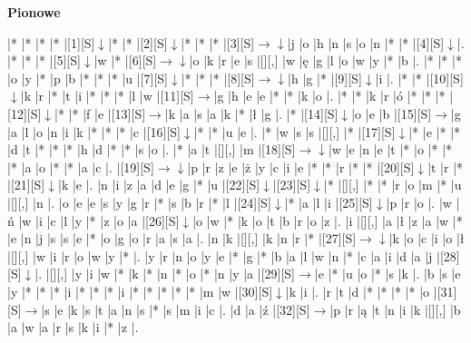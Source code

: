 \documentclass[11pt]{article}
\newcommand\drarr{$\rightarrow \!\!\!\!\! \downarrow$}
\newcommand\rarr{$\rightarrow$}
\newcommand\darr{$\downarrow$}
\begin{document}
\begin{PuzzleClues}{\textbf{Pionowe}\\}
\end{PuzzleClues}\newpage%

\noindent\begin{Puzzle}{21}{26}|*	|*	|*	|*	|[1][S]\darr	|*	|*	|[2][S]\darr	|*	|*	|*	|[3][S]\drarr	|j	|o	|h	|n	|s	|o	|n	|*	|*	|[4][S]\darr	|.
|*	|*	|*	|[5][S]\darr	|w	|*	|[6][S]\drarr	|o	|k	|r	|e	|s	|[][,]{ }	|w	|ę	|g	|l	|o	|w	|y	|*	|b	|.
|*	|*	|*	|o	|y	|*	|p	|b	|*	|*	|*	|u	|[7][S]\darr	|*	|*	|*	|[8][S]\drarr	|h	|g	|*	|[9][S]\darr	|i	|.
|*	|*	|[10][S]\darr	|k	|r	|*	|t	|i	|*	|*	|*	|l	|w	|[11][S]\rarr	|g	|h	|e	|e	|*	|*	|k	|o	|.
|*	|*	|k	|r	|ó	|*	|*	|*	|[12][S]\darr	|*	|*	|f	|e	|[13][S]\rarr	|k	|a	|s	|a	|k	|*	|ł	|g	|.
|*	|[14][S]\darr	|o	|e	|b	|[15][S]\rarr	|g	|a	|l	|o	|n	|i	|k	|*	|*	|*	|c	|[16][S]\darr	|*	|*	|u	|e	|.
|*	|w	|s	|s	|[][,]{ }	|*	|[17][S]\darr	|*	|e	|*	|*	|d	|t	|*	|*	|*	|h	|d	|*	|*	|s	|o	|.
|*	|a	|t	|[][,]{ }	|m	|[18][S]\drarr	|w	|e	|n	|e	|t	|*	|o	|*	|*	|*	|a	|o	|*	|*	|a	|c	|.
|[19][S]\drarr	|p	|r	|z	|e	|ż	|y	|c	|i	|e	|*	|*	|r	|*	|*	|[20][S]\darr	|t	|r	|*	|[21][S]\darr	|k	|e	|.
|n	|i	|z	|a	|d	|e	|g	|*	|u	|[22][S]\darr	|[23][S]\darr	|*	|[][,]{ }	|*	|*	|r	|o	|m	|*	|u	|[][,]{ }	|n	|.
|o	|e	|e	|s	|y	|g	|r	|*	|s	|b	|r	|*	|l	|[24][S]\darr	|*	|a	|l	|i	|[25][S]\darr	|p	|r	|o	|.
|w	|ń	|w	|i	|c	|l	|y	|*	|z	|o	|a	|[26][S]\darr	|o	|w	|*	|k	|o	|t	|b	|r	|o	|z	|.
|i	|[][,]{ }	|a	|ł	|z	|a	|w	|*	|e	|n	|j	|s	|s	|e	|*	|o	|g	|o	|r	|a	|s	|a	|.
|n	|k	|[][,]{ }	|k	|n	|r	|*	|[27][S]\drarr	|k	|o	|c	|i	|o	|ł	|[][,]{ }	|w	|i	|r	|o	|w	|y	|*	|.
|y	|r	|n	|o	|y	|e	|*	|g	|*	|b	|a	|l	|w	|n	|*	|c	|a	|i	|d	|a	|j	|[28][S]\darr	|.
|[][,]{ }	|y	|i	|w	|*	|k	|*	|n	|*	|o	|*	|n	|y	|a	|[29][S]\rarr	|e	|*	|u	|o	|*	|s	|k	|.
|b	|s	|e	|y	|*	|*	|*	|i	|*	|*	|*	|i	|*	|*	|*	|*	|*	|m	|w	|[30][S]\darr	|k	|i	|.
|r	|t	|d	|*	|*	|*	|*	|o	|[31][S]\rarr	|s	|e	|k	|s	|t	|a	|n	|s	|*	|s	|m	|i	|c	|.
|d	|a	|ź	|[32][S]\rarr	|p	|r	|ą	|t	|n	|i	|k	|[][,]{ }	|b	|a	|w	|a	|r	|s	|k	|i	|*	|z	|.

\end{Puzzle}
\end{document}
